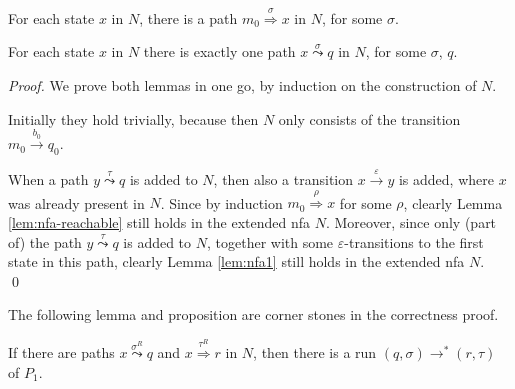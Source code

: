 \documentclass{llncs}
\newcommand{\eps}{\ensuremath{\varepsilon}}
\begin{document}
\begin{lemma}
\label{lem:nfa-reachable}
For each state $x$ in $N$, there is a path $m_0\stackrel{\sigma}{\Rightarrow}x$ in $N$, for some $\sigma$.
\end{lemma}

\begin{lemma}
\label{lem:nfa1}
For each state $x$ in $N$ there is exactly one path $x\stackrel{\sigma}{\leadsto}q$ in $N$, for some $\sigma$, $q$.
\end{lemma}

\begin{proof}
We prove both lemmas in one go, by induction on the construction of $N$.

Initially they hold trivially, because then $N$ only consists of the transition $m_0\stackrel{b_0}{\rightarrow}q_0$.

When a path $y\stackrel{\tau}{\leadsto}q$ is added to $N$, then also a transition $x\stackrel{\eps}{\rightarrow}y$
is added, where $x$ was already present in $N$. Since by induction $m_0\stackrel{\rho}{\Rightarrow}x$ for some $\rho$,
clearly Lemma \ref{lem:nfa-reachable} still holds in the extended nfa $N$.
Moreover, since only (part of) the path $y\stackrel{\tau}{\leadsto}q$ is added to $N$, together with some
$\eps$-transitions to the first state in this path, clearly Lemma \ref{lem:nfa1} still holds in the extended nfa $N$.
\qed
\end{proof}

\noindent
The following lemma and proposition are corner stones in the correctness proof.

\begin{lemma}
\label{lem:strengthening}
If there are paths $x\stackrel{\sigma^R}{\leadsto}q$ and $x\stackrel{\tau^R}{\Rightarrow}r$ in $N$, then there is a run $(q,\sigma)\rightarrow^*(r,\tau)$ of $P_1$.
\end{lemma}
\end{document}

